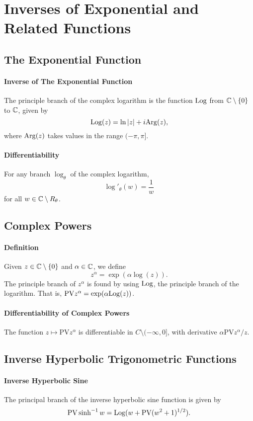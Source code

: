 \section{Inverses of Exponential and Related Functions}

\subsection{The Exponential Function}
\paragraph{Inverse of The Exponential Function}
The principle branch of the complex logarithm is the function \(\mathrm{Log}\) from \(\mathbb{C} \setminus \{0\}\) to \(\mathbb{C}\), given by
\[\mathrm{Log}(z) = \ln|z| + i\mathrm{Arg}(z),\]
where \(\mathrm{Arg}(z)\) takes values in the range \((-\pi, \pi]\).

\paragraph{Differentiability}
For any branch \(\log_\theta\) of the complex logarithm,
\[\log'_\theta (w) = \frac{1}{w}\]
for all \(w \in \mathbb{C} \setminus R_\theta\).

\subsection{Complex Powers}
\paragraph{Definition}
Given \(z \in \mathbb{C} \setminus \{0\}\) and \(\alpha \in \mathbb{C}\), we define
\[z^\alpha = \exp(\alpha\log(z)).\]
The principle branch of \(z^\alpha\) is found by using \(\mathrm{Log}\), the principle branch of the logarithm. That is, \(\mathrm{PV}z^\alpha = \exp(\alpha\mathrm{Log}(z))\).

\paragraph{Differentiability of Complex Powers}
The function \(z \mapsto \mathrm{PV}z^\alpha\) is differentiable in \(C \setminus (-\infty, 0]\), with derivative \(\alpha\mathrm{PV}z^\alpha / z\).

\subsection{Inverse Hyperbolic Trigonometric Functions}
\paragraph{Inverse Hyperbolic Sine}
The principal branch of the inverse hyperbolic sine function is given by
\[\mathrm{PV}\sinh^{-1} w = \mathrm{Log}(w + \mathrm{PV}(w^2 + 1)^{1/2}).\]

